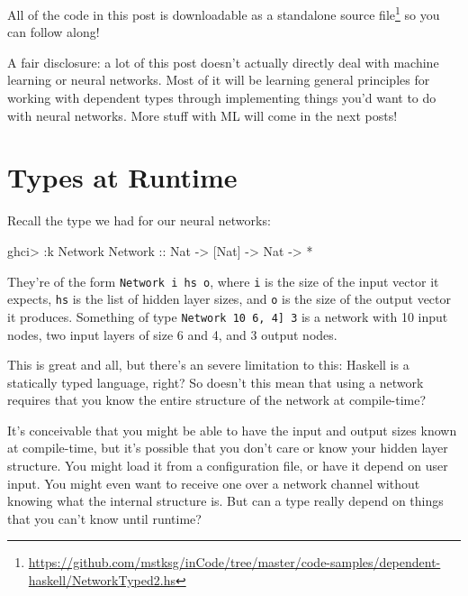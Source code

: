 \documentclass[]{article}
\newenvironment{Shaded}{}{}
\newcommand{\DataTypeTok}[1]{\textcolor[rgb]{0.56,0.13,0.00}{{#1}}}
\newcommand{\OtherTok}[1]{\textcolor[rgb]{0.00,0.44,0.13}{{#1}}}
\newcommand{\FunctionTok}[1]{\textcolor[rgb]{0.02,0.16,0.49}{{#1}}}
\newcommand{\NormalTok}[1]{{#1}}
\renewcommand{\href}[2]{#2\footnote{\url{#1}}}
\begin{document}
All of the code in this post is
\href{https://github.com/mstksg/inCode/tree/master/code-samples/dependent-haskell/NetworkTyped2.hs}{downloadable
as a standalone source file} so you can follow along!

A fair disclosure: a lot of this post doesn't actually directly deal with
machine learning or neural networks. Most of it will be learning general
principles for working with dependent types through implementing things you'd
want to do with neural networks. More stuff with ML will come in the next posts!

\section{Types at Runtime}\label{types-at-runtime}

Recall the type we had for our neural networks:

\begin{Shaded}
\begin{Highlighting}[]
\NormalTok{ghci}\FunctionTok{>} \FunctionTok{:}\NormalTok{k }\DataTypeTok{Network}
\DataTypeTok{Network}\OtherTok{ ::} \DataTypeTok{Nat} \OtherTok{->} \NormalTok{[}\DataTypeTok{Nat}\NormalTok{] }\OtherTok{->} \DataTypeTok{Nat} \OtherTok{->} \FunctionTok{*}
\end{Highlighting}
\end{Shaded}

They're of the form \texttt{Network\ i\ hs\ o}, where \texttt{i} is the size of
the input vector it expects, \texttt{hs} is the list of hidden layer sizes, and
\texttt{o} is the size of the output vector it produces. Something of type
\texttt{Network\ 10\ \textquotesingle{}{[}6,\ 4{]}\ 3} is a network with 10
input nodes, two input layers of size 6 and 4, and 3 output nodes.

This is great and all, but there's an severe limitation to this: Haskell is a
statically typed language, right? So doesn't this mean that using a network
requires that you know the entire structure of the network at compile-time?

It's conceivable that you might be able to have the input and output sizes known
at compile-time, but it's possible that you don't care or know your hidden layer
structure. You might load it from a configuration file, or have it depend on
user input. You might even want to receive one over a network channel without
knowing what the internal structure is. But can a type really depend on things
that you can't know until runtime?
\end{document}
